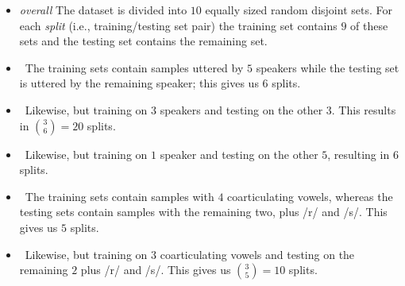 \begin{itemize}

 \item \emph{overall} The dataset is divided into $10$ equally sized random disjoint sets.
	For each \emph{split} (i.e., training/testing set pair) the training set contains $9$
	of these sets and the testing set contains the remaining set.

  \item \spka\ The training sets contain samples
  	uttered by $5$ speakers while the testing set is
  	uttered by the remaining speaker; this gives us $6$ splits.

  \item \spkb\ Likewise, but training on $3$ speakers and testing on the
  	other $3$. This results in $\binom{3}{6} = 20$ splits.

  \item \spkc\ Likewise, but training on $1$ speaker and testing on the
  	other $5$, resulting in $6$ splits.

  \item \coa\ The training sets contain samples
  	with $4$ coarticulating vowels, whereas the testing sets contain samples
  	with the remaining two, plus /r/ and /s/. This gives us $5$ splits.

  \item \cob\ Likewise, but training on $3$ coarticulating vowels and
  	testing on the remaining $2$ plus /r/ and /s/. This gives us
  	$\binom{3}{5} = 10$ splits.

\end{itemize}

